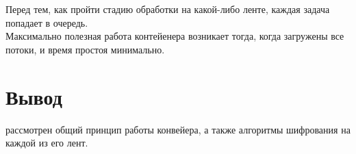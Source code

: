 Перед тем, как пройти стадию обработки на какой-либо ленте, каждая задача попадает в очередь. \\

Максимально полезная работа контейенера возникает тогда, когда загружены все потоки, и время простоя минимально.

\section*{Вывод}
 рассмотрен общий принцип работы конвейера, а также алгоритмы шифрования на каждой из его лент.